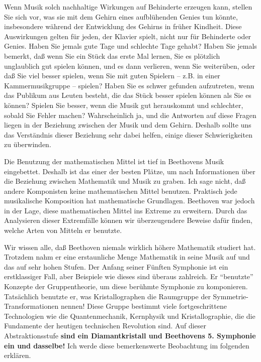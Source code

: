 Wenn Musik solch nachhaltige Wirkungen auf Behinderte erzeugen kann, stellen Sie sich vor, was sie mit dem Gehirn eines aufblühenden Genies tun könnte, insbesondere während der Entwicklung des Gehirns in früher Kindheit.
Diese Auswirkungen gelten für jeden, der Klavier spielt, nicht nur für Behinderte oder Genies.
Haben Sie jemals gute Tage und schlechte Tage gehabt?
Haben Sie jemals bemerkt, daß wenn Sie ein Stück das erste Mal lernen, Sie es plötzlich unglaublich gut spielen können, und es dann verlieren, wenn Sie weiterüben, oder daß Sie viel besser spielen, wenn Sie mit guten Spielern -- z.B. in einer Kammermusikgruppe -- spielen?
Haben Sie es schwer gefunden aufzutreten, wenn das Publikum aus Leuten besteht, die das Stück besser spielen können als Sie es können?
Spielen Sie besser, wenn die Musik gut herauskommt und schlechter, sobald Sie Fehler machen?
Wahrscheinlich ja, und die Antworten auf diese Fragen liegen in der Beziehung zwischen der Musik und dem Gehirn.
Deshalb sollte uns das Verständnis dieser Beziehung sehr dabei helfen, einige dieser Schwierigkeiten zu überwinden.


\label{c1iv4Gruppe}

Die Benutzung der mathematischen Mittel ist tief in Beethovens Musik eingebettet.
Deshalb ist das einer der besten Plätze, um nach Informationen über die Beziehung zwischen Mathematik und Musik zu graben.
Ich sage nicht, daß andere Komponisten keine mathematischen Mittel benutzen.
Praktisch jede musikalische Komposition hat mathematische Grundlagen.
Beethoven war jedoch in der Lage, diese mathematischen Mittel ins Extreme zu erweitern.
Durch das Analysieren dieser Extremfälle können wir überzeugendere Beweise dafür finden, welche Arten von Mitteln er benutzte.

Wir wissen alle, daß Beethoven niemals wirklich höhere Mathematik studiert hat.
Trotzdem nahm er eine erstaunliche Menge Mathematik in seine Musik auf und das auf sehr hohen Stufen.
Der Anfang seiner Fünften Symphonie ist ein erstklassiger Fall, aber Beispiele wie dieses sind überaus zahlreich.
Er \enquote{benutzte} Konzepte der Gruppentheorie, um diese berühmte Symphonie zu komponieren.
Tatsächlich benutzte er, was Kristallographen die Raumgruppe der Symmetrie-Transformationen nennen!
Diese Gruppe bestimmt viele fortgeschrittene Technologien wie die Quantenmechanik, Kernphysik und Kristallographie, die die Fundamente der heutigen technischen Revolution sind.
Auf dieser Abstraktionsstufe \textbf{sind ein Diamantkristall und Beethovens 5. Symphonie ein und dasselbe!}
Ich werde diese bemerkenswerte Beobachtung im folgenden erklären.

